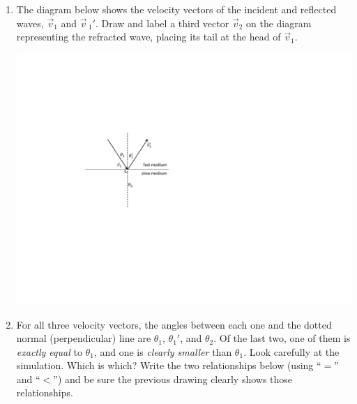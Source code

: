 \begin{enumerate}[labparts]

\item The diagram below shows the velocity vectors of the incident and reflected waves, $\vec{v}_1$ and 
$\vec{v}\,_1'$.  Draw and label a third vector $\vec{v}_2$ on the diagram representing the refracted wave, placing its tail at the head of $\vec{v}_1$.

\begin{center}
\includegraphics{deriving_snells_law/wave_vectors.pdf}
\end{center}
\newpage

\item For all three velocity vectors, the angles between each one and the dotted normal (perpendicular) line are $\theta_1$, $\theta_1'$, and $\theta_2$.  Of the last two, one of them is \textit{exactly equal} to $\theta_1$, and one is \textit{clearly smaller} than $\theta_1$.  Look carefully at the simulation.  Which is which?  Write the two relationships below (using ``$=$'' and ``$<$'') and be sure the previous drawing clearly shows those relationships.
\answerspace{0.4in}

\end{enumerate}

